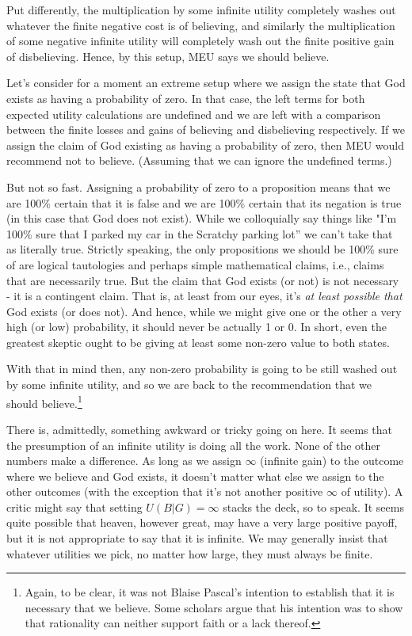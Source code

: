 \documentclass[]{tufte-book}
\begin{document}
Put differently, the multiplication by some infinite utility completely washes out whatever the finite negative cost is of believing, and similarly the multiplication of some negative infinite utility will completely wash out the finite positive gain of disbelieving. Hence, by this setup, MEU says we should believe.

Let's consider for a moment an extreme setup where we assign the state that God exists as having a probability of zero. In that case, the left terms for both expected utility calculations are undefined and we are left with a comparison between the finite losses and gains of believing and disbelieving respectively. If we assign the claim of God existing as having a probability of zero, then MEU would recommend not to believe. (Assuming that we can ignore the undefined terms.)

But not so fast. Assigning a probability of zero to a proposition means that we are 100\% certain that it is false and we are 100\% certain that its negation is true (in this case that God does not exist). While we colloquially say things like "I'm 100\% sure that I parked my car in the Scratchy parking lot'' we can't take that as literally true. Strictly speaking, the only propositions we should be 100\% sure of are logical tautologies and perhaps simple mathematical claims, i.e., claims that are necessarily true. But the claim that God exists (or not) is not necessary - it is a contingent claim. That is, at least from our eyes, it's \emph{at least possible that} God exists (or does not). And hence, while we might give one or the other a very high (or low) probability, it should never be actually 1 or 0. In short, even the greatest skeptic ought to be giving at least some non-zero value to both states.

With that in mind then, any non-zero probability is going to be still washed out by some infinite utility, and so we are back to the recommendation that we should believe.\footnote{Again, to be clear, it was not Blaise Pascal's intention to establish that it is necessary that we believe. Some scholars argue that his intention was to show that rationality can neither support faith or a lack thereof.}

There is, admittedly, something awkward or tricky going on here. It seems that the presumption of an infinite utility is doing all the work. None of the other numbers make a difference. As long as we assign \(\infty\) (infinite gain) to the outcome where we believe and God exists, it doesn't matter what else we assign to the other outcomes (with the exception that it's not another positive \(\infty\) of utility). A critic might say that setting \(U(B|G)= \infty\) stacks the deck, so to speak. It seems quite possible that heaven, however great, may have a very large positive payoff, but it is not appropriate to say that it is infinite. We may generally insist that whatever utilities we pick, no matter how large, they must always be finite.
\end{document}
